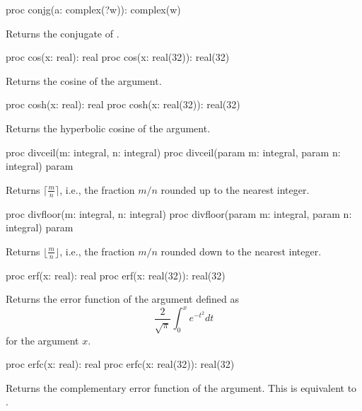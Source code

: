 \begin{protohead}
proc conjg(a: complex(?w)): complex(w)
\end{protohead}
\begin{protobody}
Returns the conjugate of .
\end{protobody}

\begin{protohead}
proc cos(x: real): real
proc cos(x: real(32)): real(32)
\end{protohead}
\begin{protobody}
Returns the cosine of the argument.
\end{protobody}

\begin{protohead}
proc cosh(x: real): real
proc cosh(x: real(32)): real(32)
\end{protohead}
\begin{protobody}
Returns the hyperbolic cosine of the argument.
\end{protobody}

\begin{protohead}
proc divceil(m: integral, n: integral)
proc divceil(param m: integral, param n: integral) param
\end{protohead}
\begin{protobody}
Returns
$\lceil\frac{m}{n}\rceil$,
i.e., the fraction $m/n$ rounded up to the nearest integer.
\end{protobody}

\begin{protohead}
proc divfloor(m: integral, n: integral)
proc divfloor(param m: integral, param n: integral) param
\end{protohead}
\begin{protobody}
Returns
$\lfloor\frac{m}{n}\rfloor$,
i.e., the fraction $m/n$ rounded down to the nearest integer.
\end{protobody}

\begin{protohead}
proc erf(x: real): real
proc erf(x: real(32)): real(32)
\end{protohead}
\begin{protobody}
Returns the error function of the argument defined as
$$\frac{2}{\sqrt{\pi}}\int^x_0e^{-t^2}dt$$
for the argument $x$.
\end{protobody}

\begin{protohead}
proc erfc(x: real): real
proc erfc(x: real(32)): real(32)
\end{protohead}
\begin{protobody}
Returns the complementary error function of the argument.  This is
equivalent to .
\end{protobody}

